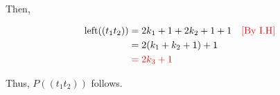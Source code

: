 \documentclass[12pt]{article}
\begin{document}
\begin{mdframed}
    \bigskip

    Then,

    \begin{align}
        \text{left}((t_1t_2)) &=  2k_1 + 1 + 2k_2 + 1 + 1 & \color{red}[\text{By I.H}]\color{black}\\
        &=  2(k_1 + k_2 + 1) + 1\\
        &\color{red}=  2k_3 + 1\color{black}
    \end{align}

    \bigskip

    Thus, $P((t_1t_2))$ follows.

\end{mdframed}















\end{document}
